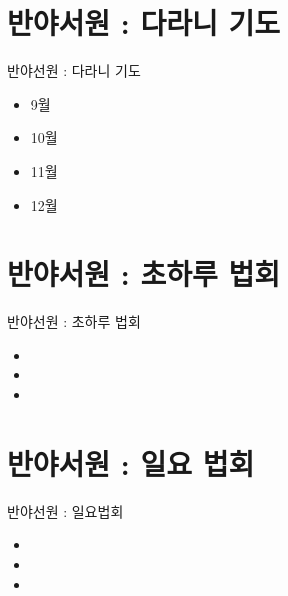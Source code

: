 \documentclass[aspectratio=1610,17pt,xcolor=pdftex,dvipsnames,table,handout]{beamer}
\begin{document}
		\section{반야서원 : 다라니 기도}

		\begin{frame} [t,plain]
			\begin{block} {반야선원 : 다라니 기도}
			\begin{itemize}
				\item 9월
				\item 10월
				\item 11월
				\item 12월
			\end{itemize}
			\end{block}
		\end{frame}

		\section{반야서원 : 초하루 법회}

		\begin{frame} [t,plain]
			\begin{block} {반야선원 : 초하루 법회}
			\begin{itemize}
				\item 
				\item 
				\item 
			\end{itemize}
			\end{block}
		\end{frame}


		\section{반야서원 : 일요 법회}

		\begin{frame} [t,plain]
			\begin{block} {반야선원 : 일요법회}
			\begin{itemize}
				\item 
				\item 
				\item 
			\end{itemize}
			\end{block}
		\end{frame}
\end{document}
